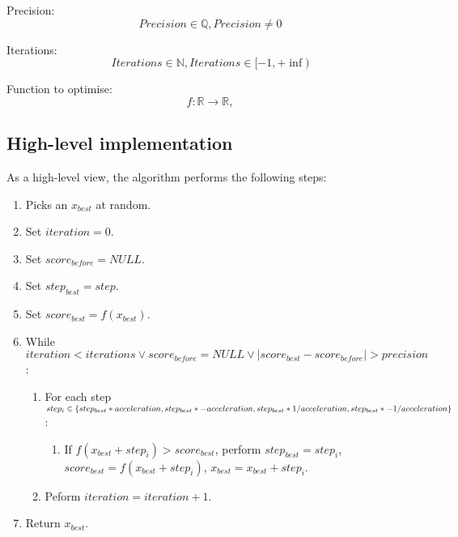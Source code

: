 \documentclass[conference]{IEEEtran}
\begin{document}
Precision:
\begin{equation} Precision \in \mathbb{Q}, Precision \ne 0 \end{equation}

Iterations:
\begin{equation} Iterations \in \mathbb{N}, Iterations \in [-1, +\inf) \end{equation}

Function to optimise:
\begin{equation} f : \mathbb{R} \rightarrow \mathbb{R},  \end{equation}


\subsection{High-level implementation}
As a high-level view, the algorithm performs the following steps:
\begin{enumerate}
    \item Picks an $x_{best}$ at random.
    \item Set $iteration = 0$.
    \item Set $score_{before} = NULL$.
    \item Set $step_{best} = step$.
    \item Set $score_{best} = f(x_{best})$.
    \item While $iteration < iterations \lor score_{before} = NULL \lor |score_{best} - score_{before}| > precision$:
    \begin{enumerate}
        \item For each step $step_i \in \{\\step_{best} * acceleration, \\step_{best} * -acceleration, \\step_{best} * 1 / acceleration, \\step_{best} * -1 / acceleration\\\}$:
        \begin{enumerate}
            \item If $f(x_{best} + step_i) > score_{best}$, perform $step_{best} = step_i$, $score_{best} = f(x_{best} + step_i)$, $x_{best} = x_{best} + step_i$.
        \end{enumerate} 
        \item Peform $iteration = iteration + 1$.
    \end{enumerate}
    \item Return $x_{best}$.
\end{enumerate}
\end{document}
